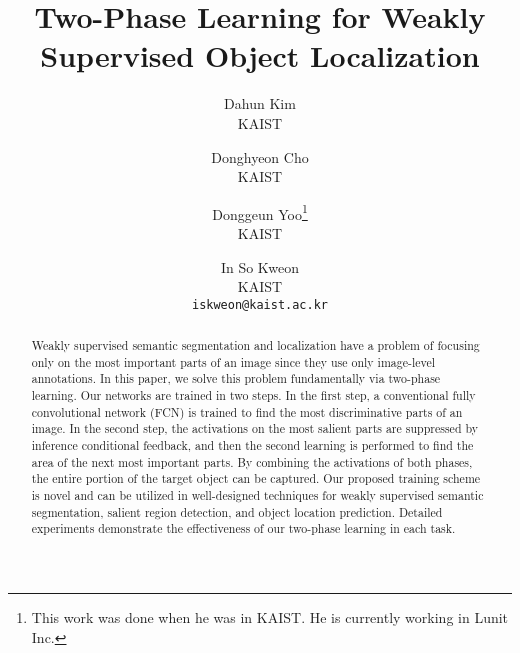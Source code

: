 \documentclass[10pt,twocolumn,letterpaper]{article}
\begin{document}
\title{Two-Phase Learning for Weakly Supervised Object Localization}

\author{\hspace{-0.1in}Dahun Kim\\
\hspace{-0.1in}KAIST\\
\hspace{-0.1in}{\tt\small mcahny@kaist.ac.kr}
\and
\hspace{-0.1in}Donghyeon Cho\\
\hspace{-0.1in}KAIST\\
\hspace{-0.1in}{\tt\small cdh12242@gmail.com}
\and
\hspace{-0.1in}Donggeun Yoo\thanks{This work was done when he was in KAIST. He is currently working in Lunit Inc.}\\
\hspace{-0.1in}KAIST\\
\hspace{-0.1in}{\tt\small dgyoo@rcv.kaist.ac.kr}
\and
In So Kweon\\
KAIST\\
{\tt\small iskweon@kaist.ac.kr}
}

\maketitle


\begin{abstract}
Weakly supervised semantic segmentation and localization have a problem of focusing only on the most important parts of an image since they use only image-level annotations. In this paper, we solve this problem fundamentally via two-phase learning. Our networks are trained in two steps. In the first step, a conventional fully convolutional network (FCN) is trained to find the most discriminative parts of an image. In the second step, the activations on the most salient parts are suppressed by inference conditional feedback, and then the second learning is performed to find the area of the next most important parts. By combining the activations of both phases, the entire portion of the target object can be captured. Our proposed training scheme is novel and can be utilized in well-designed techniques for weakly supervised semantic segmentation, salient region detection, and object location prediction. Detailed experiments demonstrate the effectiveness of our two-phase learning in each task.
\end{abstract}
\end{document}
